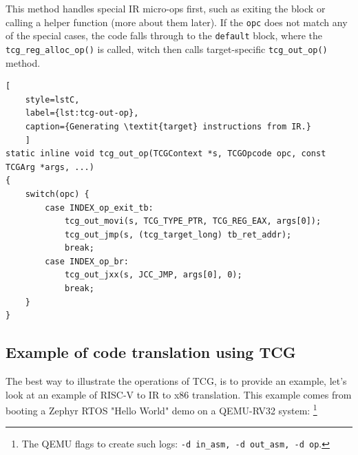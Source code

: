 \noindent
This method handles special IR micro-ops first, such as exiting the block or calling a helper function (more about them
later). If the \texttt{opc} does not match any of the special cases, the code falls through to the \texttt{default}
block, where the \texttt{tcg\_reg\_alloc\_op()} is called, witch then calls target-specific \texttt{tcg\_out\_op()} method.

\begin{lstlisting}[
    style=lstC,
    label={lst:tcg-out-op},
    caption={Generating \textit{target} instructions from IR.}
    ]
static inline void tcg_out_op(TCGContext *s, TCGOpcode opc, const TCGArg *args, ...)
{
    switch(opc) {
        case INDEX_op_exit_tb:
            tcg_out_movi(s, TCG_TYPE_PTR, TCG_REG_EAX, args[0]);
            tcg_out_jmp(s, (tcg_target_long) tb_ret_addr);
            break;
        case INDEX_op_br:
            tcg_out_jxx(s, JCC_JMP, args[0], 0);
            break;
    }
}
\end{lstlisting}

\pagebreak
\subsection{Example of code translation using TCG}

The best way to illustrate the operations of TCG, is to provide an example, let's look at an example of RISC-V to IR to
x86 translation. This example comes from booting a Zephyr RTOS "Hello World" demo on a QEMU-RV32 system:%
\footnote{The QEMU flags to create such logs: \texttt{-d in\_asm, -d out\_asm, -d op}.}

